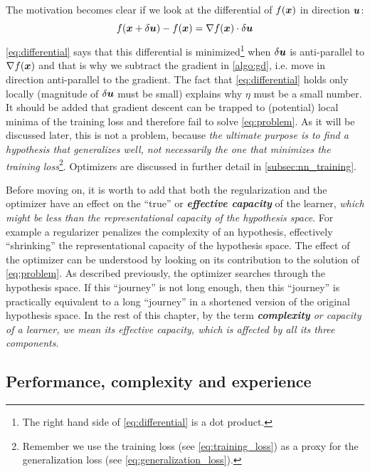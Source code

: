 The motivation becomes clear if we look at the differential of $f(\boldsymbol{x})$ in
direction $\boldsymbol{u}$: \begin{equation} \label{eq:differential} f(\boldsymbol{x} + \delta
\boldsymbol{u}) - f(\boldsymbol{x}) = \nabla f(\boldsymbol{x}) \cdot \delta \boldsymbol{u} \end{equation} \Equation{}
\ref{eq:differential} says that this differential is minimized\footnote{The
right hand side of \Equation{} \ref{eq:differential} is a dot product.} when
$\delta \boldsymbol{u}$ is anti-parallel to $\nabla f(\boldsymbol{x})$ and that is why we subtract
the gradient in \Algorithm{} \ref{algo:gd}, i.e. move in direction anti-parallel to
the gradient. The fact that \Equation{} \ref{eq:differential} holds only locally
(magnitude of $\delta \boldsymbol{u}$ must be small) explains why $\eta$ must be a small
number. It should be added that gradient descent can be trapped to (potential)
local minima of the training loss and therefore fail to solve \Equation{}
\ref{eq:problem}. As it will be discussed later, this is not a problem, because
\emph{the ultimate purpose is to find a hypothesis that generalizes well, not
necessarily the one that minimizes the training loss}\footnote{Remember we use
the training loss (see \Equation{} \ref{eq:training_loss}) as a proxy for the
generalization loss (see \Equation{} \ref{eq:generalization_loss}).}. Optimizers
are discussed in further detail in \Section{} \ref{subsec:nn_training}.

Before moving on, it is worth to add that both the regularization and the
optimizer have an effect on the ``true'' or \emph{\textbf{effective
capacity}} \parencite{deeplearning} of the learner,
\emph{which might be less than the representational
capacity of the hypothesis space}. For example
a regularizer penalizes the complexity of an hypothesis, effectively
``shrinking'' the representational capacity of the hypothesis space. The effect
of the optimizer can be understood by looking on its contribution to the
solution of \Equation{} \ref{eq:problem}. As described previously, the optimizer
searches through the hypothesis space. If this ``journey'' is not long enough,
then this ``journey'' is practically equivalent to a long ``journey'' in a
shortened version of the original hypothesis space. In the rest of this chapter,
by the term \emph{\textbf{complexity} or
capacity of a learner, we mean its effective capacity, which is
affected by all its three components}.

\subsection{Performance, complexity and experience}
\label{subsec:per_com_exp}

